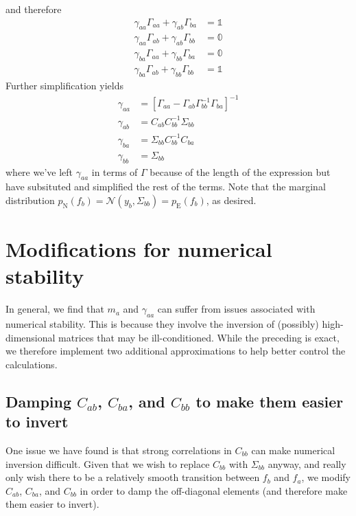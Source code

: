 \documentclass[onecolumn]{article}
\begin{document}
and therefore
\begin{align}
    \gamma_{aa} \Gamma_{aa} + \gamma_{ab} \Gamma_{ba} & = \mathbb{1} \\
    \gamma_{aa} \Gamma_{ab} + \gamma_{ab} \Gamma_{bb} & = \mathbb{0} \\
    \gamma_{ba} \Gamma_{aa} + \gamma_{bb} \Gamma_{ba} & = \mathbb{0} \\
    \gamma_{ba} \Gamma_{ab} + \gamma_{bb} \Gamma_{bb} & = \mathbb{1}
\end{align}
Further simplification yields
\begin{align}
    \gamma_{aa} & = \left[\Gamma_{aa} - \Gamma_{ab} \Gamma_{bb}^{-1} \Gamma_{ba} \right]^{-1} \\
    \gamma_{ab} & = C_{ab} C_{bb}^{-1} \Sigma_{bb} \\
    \gamma_{ba} & = \Sigma_{bb} C_{bb}^{-1} C_{ba} \\
    \gamma_{bb} & = \Sigma_{bb}
\end{align}
where we've left $\gamma_{aa}$ in terms of $\Gamma$ because of the length of the expression but have subsituted and simplified the rest of the terms.
Note that the marginal distribution $p_\mathrm{N}(f_b) = \mathcal{N}(y_b,\Sigma_{bb}) = p_\mathrm{E}(f_b)$, as desired.


\section*{Modifications for numerical stability}
\label{sec:numerical stability}

In general, we find that $m_a$ and $\gamma_{aa}$ can suffer from issues associated with numerical stability.
This is because they involve the inversion of (possibly) high-dimensional matrices that may be ill-conditioned.
While the preceding is exact, we therefore implement two additional approximations to help better control the calculations.


\subsection*{Damping $C_{ab}$, $C_{ba}$, and $C_{bb}$ to make them easier to invert}

One issue we have found is that strong correlations in $C_{bb}$ can make numerical inversion difficult.
Given that we wish to replace $C_{bb}$ with $\Sigma_{bb}$ anyway, and really only wish there to be a relatively smooth transition between $f_b$ and $f_a$, we modify $C_{ab}$, $C_{ba}$, and $C_{bb}$ in order to damp the off-diagonal elements (and therefore make them easier to invert).
\end{document}
